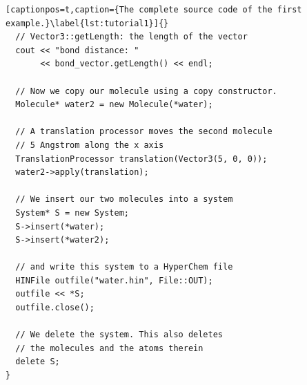\begin{lstlisting}[captionpos=t,caption={The complete source code of the first example.}\label{lst:tutorial1}]{}
  // Vector3::getLength: the length of the vector
  cout << "bond distance: " 
       << bond_vector.getLength() << endl;

  // Now we copy our molecule using a copy constructor.
  Molecule* water2 = new Molecule(*water);

  // A translation processor moves the second molecule
  // 5 Angstrom along the x axis
  TranslationProcessor translation(Vector3(5, 0, 0));
  water2->apply(translation);

  // We insert our two molecules into a system
  System* S = new System;
  S->insert(*water);
  S->insert(*water2);

  // and write this system to a HyperChem file
  HINFile outfile("water.hin", File::OUT);
  outfile << *S;
  outfile.close();

  // We delete the system. This also deletes 
  // the molecules and the atoms therein
  delete S;
}
\end{lstlisting}

